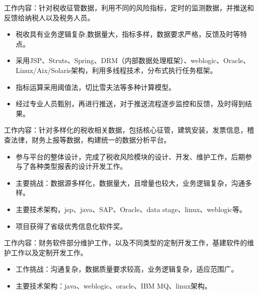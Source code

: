 \documentclass{resume}
\begin{document}
\begin{onehalfspacing}
工作内容：针对税收征管数据，利用不同的风险指标，定时的监测数据，并推送和反馈给纳税人以及税务人员。
\begin{itemize}
  \item 税收具有业务逻辑复杂,数据量大，指标多样，数据要求严格，反馈及时等特点。
  \item 采用JSP、Struts、Spring、DRM（内部数据处理框架）、weblogic、Oracle、Linux/Aix/Solaris架构，利用多线程技术，分布式执行任务框架。
  \item 指标运算采用阈值法，切比雪夫法等多种计算模型。
  \item 经过专业人员甄别，再进行推送，对于推送流程逐步监控和反馈，及时得到结果。
\end{itemize}
\end{onehalfspacing}

\begin{onehalfspacing}
工作内容：针对多样化的税收相关数据，包括核心征管，建筑安装，发票信息，稽查法律，财务上报等数据，构建统一的数据分析平台。
\begin{itemize}
  \item 参与平台的整体设计，完成了税收风险模块的设计、开发、维护工作，后期参与了各种类型报表的设计开发工作。
  \item 主要挑战：数据源多样化，数据量大，且增量也较大，业务逻辑复杂，沟通多样。
  \item 主要技术架构，jsp、java、SAP、Oracle、data stage、linux、weblogic等。
  \item 项目获得了省级优秀信息化软件奖。
\end{itemize}
\end{onehalfspacing}

\begin{onehalfspacing}
工作内容：财务软件部分维护工作，以及不同类型的定制开发工作，基建软件的维护工作以及定制开发工作。
\begin{itemize}
  \item 工作挑战：沟通复杂，数据质量要求较高，业务逻辑复杂，适应范围广。
  \item 主要技术架构：java、weblogic、oracle、IBM MQ、linux架构。
\end{itemize}
\end{onehalfspacing}
\end{document}
